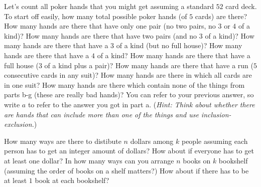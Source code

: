 \documentclass[12pt,twoside]{article}
\newcommand{\hint}[1]{({\it Hint: #1})}
\begin{document}
\begin{problem}{50}
Let's count all poker hands that you might get assuming a standard $52$ card deck.
\bparts
{}
To start off easily, how many total possible poker hands (of $5$ cards) are there?
\solution{\[\binom{52}5\]}
How many hands are there that have only one pair (no two pairs, no $3$ or $4$ of a kind)?
How many hands are there that have two pairs (and no $3$ of a kind)?
How many hands are there that have a $3$ of a kind (but no full house)?
How many hands are there that have a $4$ of a kind?
\solution{\[13 \cdot 48\]}
How many hands are there that have a full house ($3$ of a kind plus a pair)?
How many hands are there that have a run ($5$ consecutive cards in any suit)?
\solution{\[9 \cdot 4^5\]}
How many hands are there in which all cards are in one suit?
How many hands are there which contain none of the things from parts b-g (these are really bad hands)? You can refer to your previous answer, so write $a$ to refer to the answer you got in part a.
\hint{Think about whether there are hands that can include more than one of the things and use inclusion-exclusion.}
\eparts
\end{problem}

\begin{problem}{30}
\bparts
{}
How many ways are there to distibute $n$ dollars among $k$ people assuming each person has to get an integer amount of dollars?
\solution{\[\binom{n+k-1}{k-1}\]}
How about if everyone has to get at least one dollar?
\solution{\[\binom{n-1}{k-1}\]}
In how many ways can you arrange $n$ books on $k$ bookshelf (assuming the order of books on a shelf matters?)
How about if there has to be at least $1$ book at each bookshelf?
\eparts
\end{problem}
\end{document}
